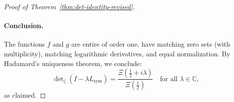 \begin{proof}[Proof of Theorem~\ref{thm:det-identity-revised}]
\paragraph{Conclusion.}
The functions \( f \) and \( g \) are entire of order one, have matching zero sets (with multiplicity), matching logarithmic derivatives, and equal normalization. By Hadamard's uniqueness theorem, we conclude:
\[
\det\nolimits_\zeta(I - \lambda L_{\mathrm{sym}}) = \frac{\Xi\left( \tfrac{1}{2} + i\lambda \right)}{\Xi\left( \tfrac{1}{2} \right)}
\quad \text{for all } \lambda \in \mathbb{C},
\]
as claimed.
\end{proof}
% 